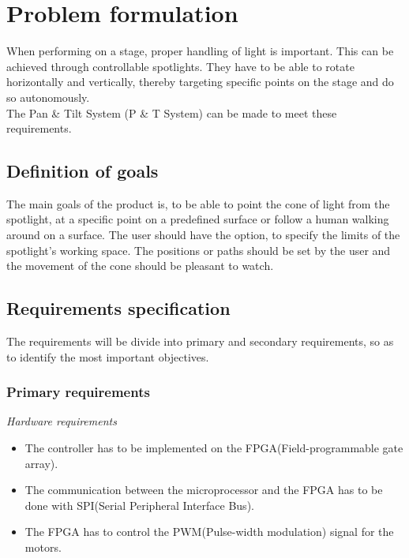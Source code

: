 \newpage

\section{Problem formulation}

When performing on a stage, proper handling of light is important. This can be achieved through controllable spotlights. They have to be able to rotate horizontally and vertically, thereby targeting specific points on the stage and do so autonomously.\\
The Pan \& Tilt System (P \& T System) can be made to meet these requirements.


\subsection{Definition of goals}
The main goals of the product is, to be able to point the cone of light from the spotlight, at a specific point on a predefined surface or follow a human walking around on a surface. The user should have the option, to specify the limits of the spotlight's working space. The positions or paths should be set by the user and the movement of the cone should be pleasant to watch.


\subsection{Requirements specification}
\label{sec:RequirementsSpecification}

The requirements will be divide into primary and secondary requirements, so as to identify the most important objectives.


\subsubsection{Primary requirements}

\textit{Hardware requirements}

\begin{itemize}

\item The controller has to be implemented on the FPGA(Field-programmable gate array).

\item The communication between the microprocessor and the FPGA has to be done with SPI(Serial Peripheral Interface Bus).

\item The FPGA has to control the PWM(Pulse-width modulation) signal for the motors.
\end{itemize}


